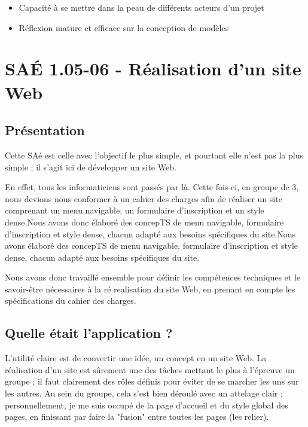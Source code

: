 \documentclass{mytex}
\begin{document}
\begin{itemize}
	\item Capacité à se mettre dans la peau de différents acteurs d'un projet
	\item Réflexion mature et efficace sur la conception de modèles
\end{itemize}

\section{SAÉ 1.05-06 - Réalisation d'un site Web}

\subsection{Présentation}

Cette SAé est celle avec l'objectif le plus simple, et pourtant elle n'est pas la plus simple ; il s'agit ici de développer un site Web. 

En effet, tous les informaticiens sont passés par là. Cette fois-ci, en groupe de 3, nous devions nous conformer à un cahier des charges afin de réaliser un site comprenant un menu navigable, un formulaire d'inscription et un style dense.Nous avons donc élaboré des concepTS de menu navigable, formulaire d'inscription et style dense, chacun adapté aux besoins spécifiques du site.Nous avons élaboré des concepTS de menu navigable, formulaire d'inscription et style dense, chacun adapté aux besoins spécifiques du site.

Nous avons donc travaillé ensemble pour définir les compétences techniques et le savoir-être nécessaires à la ré realisation du site Web, en prenant en compte les spécifications du cahier des charges.

\subsection{Quelle était l'application ?}

L'utilité claire est de convertir une idée, un concept en un site Web. La réalisation d'un site est sûrement une des tâches mettant le plus à l'épreuve un groupe ; il faut clairement des rôles définis pour éviter de se marcher les uns sur les autres. Au sein du groupe, cela s'est bien déroulé avec un attelage clair ; personnellement, je me suis occupé de la page d'accueil et du style global des pages, en finissant par faire la "fusion" entre toutes les pages (les relier). 
\end{document}
